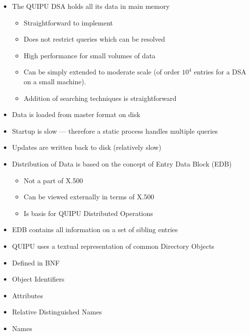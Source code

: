 \begin {bwslide}
\begin {itemize}
\item The QUIPU DSA holds all its data in main memory
\begin {itemize}
\item Straightforward to implement
\item Does not restrict queries which can be resolved
\item High performance for small volumes of data
\item Can be simply extended to moderate scale (of order $10^{4}$ entries
for a DSA on a small machine).
\item Addition of searching techniques is straightforward
\end {itemize}

\item Data is loaded from master format on disk

\item Startup is slow --- therefore a static process handles multiple queries

\item Updates are written back to disk (relatively slow)

\end {itemize}
\end {bwslide}



\begin {bwslide}
\begin {itemize}
\item  Distribution of Data is based on the concept of Entry Data Block (EDB)
\begin {itemize}
\item Not a part of X.500
\item Can be viewed externally in terms of X.500
\item Is basis for QUIPU Distributed Operations
\end {itemize}

\item EDB contains all information on a set of sibling entries
\end {itemize}
\end {bwslide}

\begin {bwslide}
\begin {itemize}
\item QUIPU uses a textual representation of common Directory Objects
\item Defined in BNF
\item Object Identifiers 
\item Attributes 
\item Relative Distinguished Names
\item Names
\end {itemize}
\end {bwslide}


